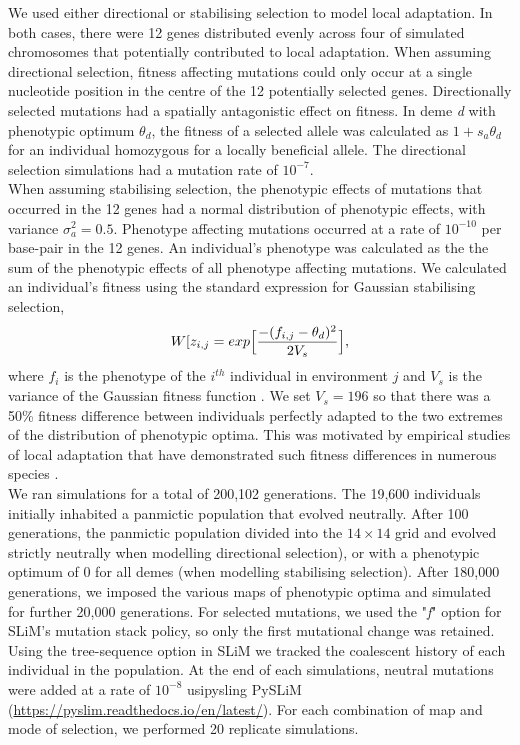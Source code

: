 \documentclass[10pt,twoside,lineno, twocolumn]{GSA_format}
\begin{document}
We used either directional or stabilising selection to model local adaptation. In both cases, there were 12 genes distributed evenly across four of simulated chromosomes that potentially contributed to local adaptation. When assuming directional selection, fitness affecting mutations could only occur at a single nucleotide position in the centre of the 12 potentially selected genes. Directionally selected mutations had a spatially antagonistic effect on fitness. In deme \textit{d} with phenotypic optimum $\theta_d$, the fitness of a selected allele was calculated as $1 + s_a\theta_d$ for an individual homozygous for a locally beneficial allele. The directional selection simulations had a mutation rate of $10^{-7}$.  \\

When assuming stabilising selection, the phenotypic effects of mutations that occurred in the 12 genes had a normal distribution of phenotypic effects, with variance $\sigma_a^2 = 0.5$. Phenotype affecting mutations occurred at a rate of $10^{-10}$ per base-pair in the 12 genes. An individual's phenotype was calculated as the the sum of the phenotypic effects of all phenotype affecting mutations. We calculated an individual's fitness using the standard expression for Gaussian stabilising selection,
\begin{equation}
\notag
W[z_{i,j} = exp \Big[\frac{-(f_{i,j} - \theta_d)^2}{2V_s}\Big],
\end{equation}
where $f_i$ is the phenotype of the $i^{th}$ individual in environment $j$ and $V_s$ is the variance of the Gaussian fitness function \citep{Walsh}. We set $V_s = 196$ so that there was a 50\% fitness difference between individuals perfectly adapted to the  two extremes of the distribution of phenotypic optima. This was motivated by empirical studies of local adaptation that have demonstrated such fitness differences in numerous species \citep{Hereford2009, Bontrager2020}.\\ 

We ran simulations for a total of 200,102 generations. The 19,600 individuals initially inhabited a panmictic population that evolved neutrally. After 100 generations, the panmictic population divided into the $14\times14$ grid and evolved strictly neutrally when modelling directional selection), or with a phenotypic optimum of 0 for all demes (when modelling stabilising selection). After 180,000 generations, we imposed the various maps of phenotypic optima and simulated for further 20,000 generations.  For selected mutations, we used the "\textit{f}" option for SLiM's mutation stack policy, so only the first mutational change was retained. Using the tree-sequence option in SLiM \citep{Haller2019-za} we tracked the coalescent history of each individual in the population. At the end of each simulations, neutral mutations were added at a rate of $10^{-8}$ usipysling PySLiM (\url{https://pyslim.readthedocs.io/en/latest/}). For each combination of map and mode of selection, we performed 20 replicate simulations. \\
\end{document}
